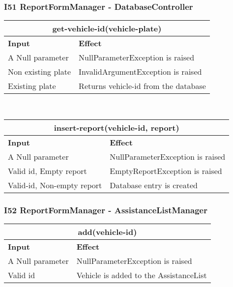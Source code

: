\subsubsection{I51 ReportFormManager - DatabaseController}
\begin{tabular}{|p{5cm}|p{7cm}|}
\hline
\multicolumn{2}{|c|}{get-vehicle-id(vehicle-plate)} \\
\hline
\textbf{Input} & \textbf{Effect} \\

\hline
A Null parameter & NullParameterException is raised \\

\hline
Non existing plate & InvalidArgumentException is raised \\

\hline
Existing plate & Returns vehicle-id from the database \\
\hline
\end{tabular}
\\
\begin{tabular}{|p{5cm}|p{7cm}|}
\hline
\multicolumn{2}{|c|}{insert-report(vehicle-id, report)} \\
\hline
\textbf{Input} & \textbf{Effect} \\

\hline
A Null parameter & NullParameterException is raised \\

\hline
Valid id, Empty report & EmptyReportException is raised \\

\hline
Valid-id, Non-empty report & Database entry is created \\
\hline
\end{tabular}

\subsubsection{I52 ReportFormManager - AssistanceListManager}
\begin{tabular}{|p{5cm}|p{7cm}|}
\hline
\multicolumn{2}{|c|}{add(vehicle-id)} \\
\hline
\textbf{Input} & \textbf{Effect} \\

\hline
A Null parameter & NullParameterException is raised \\

\hline
Valid id & Vehicle is added to the AssistanceList \\
\hline
\end{tabular}
